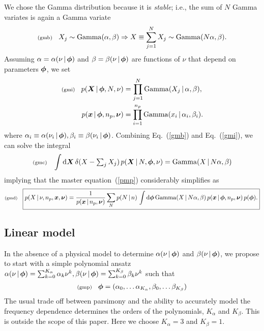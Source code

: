\documentclass[11pt]{article}
\newcommand{\lleq}[1]{\label{#1} }
\renewcommand{\lleq}[1]{\label{#1} {\scriptstyle {\rm (#1)}} \hspace*{2ex} }
\newcommand{\cond}{\,|\,}
\newcommand{\refeq}[1]{Eq.~(\ref{#1})}
\DeclareMathOperator{\GammaDist}{Gamma}
\newcommand{\Kalpha}{{K_\alpha}}
\newcommand{\Kbeta}{{K_\beta}}
\newcommand{\npack}{{n_p}}
\newcommand{\rmdx}[1]{\dd{#1}} %
\begin{document}
We chose the Gamma distribution because it is \emph{stable}; i.e.,
the sum of $N$ Gamma variates is again a Gamma variate
\begin{align}
  \lleq{gmb}
    X_j \sim \GammaDist(\alpha, \beta) \Rightarrow X \equiv \sum_{j=1}^N X_j \sim \GammaDist(N \alpha, \beta).
\end{align}
Assuming $\alpha = \alpha(\nu \cond \bmphi)$ and $\beta = \beta(\nu
\cond \bmphi)$ are functions of $\nu$ that depend on parameters
${\bm{\phi}}$, we set
\begin{align}
  \lleq{gmi}
  p(\bmX \cond \bmphi, N, \nu) &= \prod_{j=1}^N \GammaDist(X_j \cond \alpha, \beta ),\\
  p(\bmx \cond \bmphi, \npack, \bmnu) &= \prod_{i=1}^{\npack} \GammaDist(x_i \cond \alpha_i, \beta_i).
\end{align}
where $\alpha_i \equiv \alpha(\nu_i \cond \bmphi), \beta_i \equiv
\beta(\nu_i \cond \bmphi)$.  Combining \refeq{gmb} and \refeq{gmi}, we
can solve the integral
\begin{align}
  \lleq{gmc}
  \int \rmdx{\bmX} \delta(X - \textstyle\sum_j X_j)
  \,p(\bmX\cond N,\bmphi, \nu) = \GammaDist(X \cond N \alpha, \beta)
\end{align}
implying that the master equation~(\ref{pmp}) considerably simplifies
as
\begin{align}
  \lleq{gmd}
    \boxed{
    p(X\cond \nu, \npack,\bmx,\bmnu)
  = \frac{1}{p(\bmx\cond \npack, \bmnu)}
  \sum_N p(N\cond n)\, \int \rmdx{\bmphi} \GammaDist(X \cond N \alpha, \beta) %
  \, p(\bmx\cond \bmphi, \npack, \bmnu)
  \, p(\bmphi).
  }
\end{align}

\subsection{Linear model}

In the absence of a physical model to determine $\alpha(\nu \cond
\bmphi)$ and $\beta(\nu \cond \bmphi)$, we propose to start with a simple polynomial ansatz   $\alpha(\nu \cond \bmphi) = \sum_{k=0}^\Kalpha \alpha_k \nu^k, \beta(\nu \cond \bmphi) = \sum_{k=0}^\Kbeta \beta_k \nu^k$ such that
\begin{align}
  \lleq{gmp}
  \bmphi = (\alpha_0, \dots \alpha_\Kalpha , \beta_0, \dots \beta_\Kbeta)
\end{align}
The usual trade off between parsimony and the ability to accurately
model the frequency dependence determines the orders of the
polynomials, $\Kalpha$ and $\Kbeta$. This is outside the scope of this
paper. Here we choose $\Kalpha = 3$ and $\Kbeta = 1$.
\end{document}
